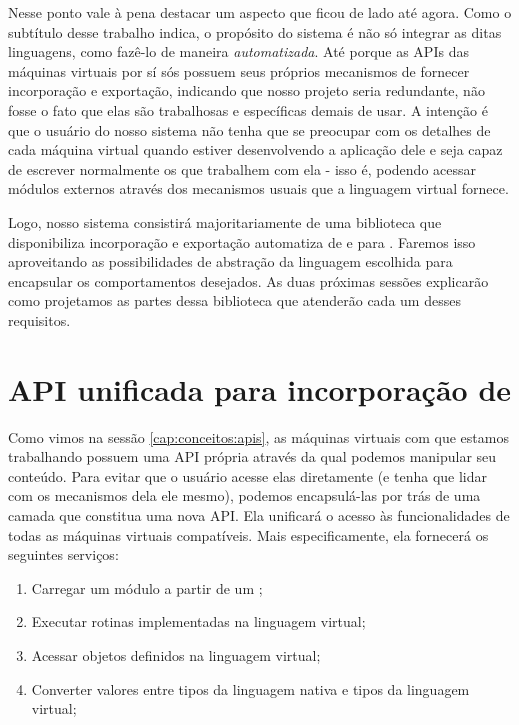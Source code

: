     Nesse ponto vale à pena destacar um aspecto que ficou de lado até agora.
    Como o subtítulo desse trabalho indica, o propósito do sistema é não só
    integrar as ditas linguagens, como fazê-lo de maneira \textit{automatizada}.
    Até porque as APIs das máquinas virtuais por sí sós possuem seus próprios
    mecanismos de fornecer incorporação e exportação, indicando que nosso
    projeto seria redundante, não fosse o fato que elas são trabalhosas e
    específicas demais de usar. A intenção é que o usuário do nosso sistema não
    tenha que se preocupar com os detalhes de cada máquina virtual quando
    estiver desenvolvendo a aplicação dele e seja capaz de escrever normalmente
    os  que trabalhem com ela - isso é, podendo acessar módulos
    externos através dos mecanismos usuais que a linguagem virtual fornece.

    Logo, nosso sistema consistirá majoritariamente de uma biblioteca \CXX{}
    que disponibiliza incorporação e exportação automatiza de e para .
    Faremos isso aproveitando as possibilidades de abstração da linguagem
    escolhida para encapsular os comportamentos desejados. As duas próximas
    sessões explicarão como projetamos as partes dessa biblioteca que atenderão
    cada um desses requisitos.

  \section{API unificada para incorporação de }
  \label{sec:estrutura:opa}

    Como vimos na sessão \ref{cap:conceitos:apis}, as máquinas virtuais com que
    estamos trabalhando possuem uma API própria através da qual podemos
    manipular seu conteúdo. Para evitar que o usuário acesse elas diretamente
    (e tenha que lidar com os mecanismos dela ele mesmo), podemos encapsulá-las
    por trás de uma camada que constitua uma nova API. Ela unificará o acesso às
    funcionalidades de todas as máquinas virtuais compatíveis. Mais
    especificamente, ela fornecerá os seguintes serviços:

    \begin{enumerate}
      \item Carregar um módulo a partir de um \script{};
      \item Executar rotinas implementadas na linguagem virtual;
      \item Acessar objetos definidos na linguagem virtual;
      \item Converter valores entre tipos da linguagem nativa e tipos da
            linguagem virtual;
    \end{enumerate}

